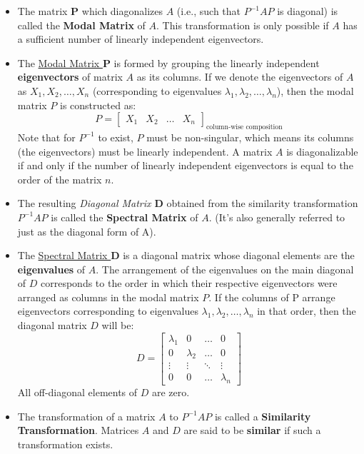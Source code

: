 \documentclass{article}
\begin{document}
\begin{itemize}
    \item The matrix $\mathbf{P}$ which diagonalizes $A$ (i.e., such that $P^{-1}AP$ is diagonal) is called the \textbf{Modal Matrix} of $A$. This transformation is only possible if $A$ has a sufficient number of linearly independent eigenvectors.

    \item The \underline{Modal Matrix $\mathbf{P}$} is formed by grouping the linearly independent \textbf{eigenvectors} of matrix $A$ as its columns. If we denote the eigenvectors of $A$ as $X_1, X_2, \dots, X_n$ (corresponding to eigenvalues $\lambda_1, \lambda_2, \dots, \lambda_n$), then the modal matrix $P$ is constructed as:
    \[ P = \begin{bmatrix} X_1 & X_2 & \dots & X_n \end{bmatrix}_{\text{column-wise composition}} \]
    Note that for $P^{-1}$ to exist, $P$ must be non-singular, which means its columns (the eigenvectors) must be linearly independent. A matrix $A$ is diagonalizable if and only if the number of linearly independent eigenvectors is equal to the order of the matrix $n$.

    \item The resulting \textit{Diagonal Matrix $\mathbf{D}$} obtained from the similarity transformation $P^{-1}AP$ is called the \textbf{Spectral Matrix} of $A$. (It's also generally referred to just as the diagonal form of A).

    \item The \underline{Spectral Matrix $\mathbf{D}$} is a diagonal matrix whose diagonal elements are the \textbf{eigenvalues} of $A$. The arrangement of the eigenvalues on the main diagonal of $D$ corresponds to the order in which their respective eigenvectors were arranged as columns in the modal matrix $P$. If the columns of P arrange eigenvectors corresponding to eigenvalues $\lambda_1, \lambda_2, \dots, \lambda_n$ in that order, then the diagonal matrix $D$ will be:
    \[ D = \begin{bmatrix}
    \lambda_1 & 0 & \dots & 0 \\
    0 & \lambda_2 & \dots & 0 \\
    \vdots & \vdots & \ddots & \vdots \\
    0 & 0 & \dots & \lambda_n
    \end{bmatrix} \]
    All off-diagonal elements of $D$ are zero.

    \item The transformation of a matrix $A$ to $P^{-1}AP$ is called a \textbf{Similarity Transformation}. Matrices $A$ and $D$ are said to be \textbf{similar} if such a transformation exists.

\end{itemize}
\end{document}
